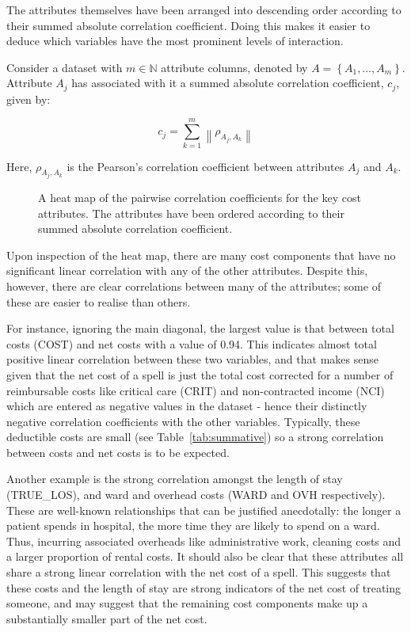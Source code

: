 The attributes themselves have been arranged into descending order according to
their summed absolute correlation coefficient. Doing this makes it easier to
deduce which variables have the most prominent levels of interaction.

\begin{definition}
    Consider a dataset with \(m \in \mathbb{N}\) attribute columns, denoted
    by \(A = \left\{A_1, \ldots, A_m\right\}\). Attribute \(A_j\) has
    associated with it a summed absolute correlation coefficient, \(c_j\), given
    by:
    
    \[
        c_j = \sum_{k=1}^{m} \left\| \rho_{A_j, A_k} \right\|
    \]

    Here, \(\rho_{A_j, A_k}\) is the Pearson's correlation coefficient
    between attributes \(A_j\) and \(A_k\).
\end{definition}\label{def:absolute_correlation}

\begin{figure}[htbp]
    \caption{A heat map of the pairwise correlation coefficients for the key
        cost attributes. The attributes have been ordered according to their
        summed absolute correlation coefficient.}%
    \label{fig:corr_heatmap}
\end{figure}

Upon inspection of the heat map, there are many cost components that have no
significant linear correlation with any of the other attributes. Despite this,
however, there are clear correlations between many of the attributes; some of
these are easier to realise than others.

For instance, ignoring the main diagonal, the largest value is that between
total costs (COST) and net costs with a value of 0.94. This indicates almost
total positive linear correlation between these two variables, and that makes
sense given that the net cost of a spell is just the total cost corrected for a
number of reimbursable costs like critical care (CRIT) and non-contracted income
(NCI) which are entered as negative values in the dataset \-- hence their
distinctly negative correlation coefficients with the other variables.
Typically, these deductible costs are small (see Table~\ref{tab:summative}) so a
strong correlation between costs and net costs is to be expected.

Another example is the strong correlation amongst the length of stay
(TRUE\_LOS), and ward and overhead costs (WARD and OVH respectively). These are
well-known relationships that can be justified anecdotally: the longer a patient
spends in hospital, the more time they are likely to spend on a ward. Thus,
incurring associated overheads like administrative work, cleaning costs and a
larger proportion of rental costs. It should also be clear that these attributes
all share a strong linear correlation with the net cost of a spell. This
suggests that these costs and the length of stay are strong indicators of the
net cost of treating someone, and may suggest that the remaining cost components 
make up a substantially smaller part of the net cost.


